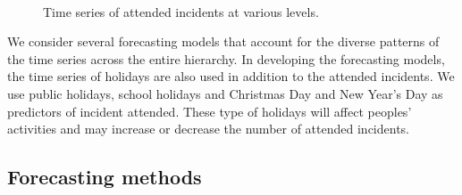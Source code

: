 \documentclass[
  authoryear,
  preprint,
  3p]{elsarticle}
\begin{document}
\begin{figure}
\begin{minipage}[t]{0.49\linewidth}
\end{minipage}%
%
\begin{minipage}[t]{0.02\linewidth}

{\centering 

~

}

\end{minipage}%
%
\begin{minipage}[t]{0.49\linewidth}

{\centering 


}

\end{minipage}%
\newline
\begin{minipage}[t]{\linewidth}

{\centering 


}

\end{minipage}%

\caption{\label{fig-dataviz}Time series of attended incidents at various
levels.}

\end{figure}

We consider several forecasting models that account for the diverse
patterns of the time series across the entire hierarchy. In developing
the forecasting models, the time series of holidays are also used in
addition to the attended incidents. We use public holidays, school
holidays and Christmas Day and New Year's Day as predictors of incident
attended. These type of holidays will affect peoples' activities and may
increase or decrease the number of attended incidents.

\hypertarget{forecasting-methods}{%
\subsection{Forecasting methods}\label{forecasting-methods}}
\end{document}
